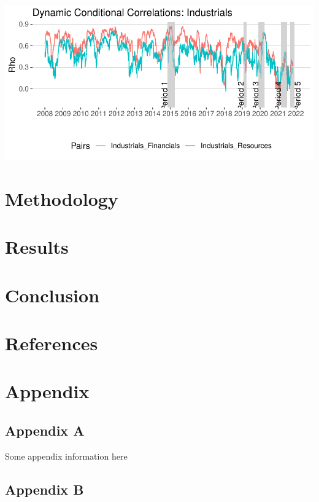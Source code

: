 \documentclass[11pt,preprint, authoryear]{elsarticle}
\let\origfigure\figure
\let\endorigfigure\endfigure
\renewenvironment{figure}[1][2] {
    \expandafter\origfigure\expandafter[H]
} {
    \endorigfigure
}
\numberwithin{equation}{section}
\numberwithin{figure}{section}
\numberwithin{table}{section}
\newlength{\cslhangindent}
\newenvironment{CSLReferences}%
  {\setlength{\parindent}{0pt}%
  \everypar{\setlength{\hangindent}{\cslhangindent}}\ignorespaces}%
  {\par}
\begin{document}
\begin{figure}[H]

{\centering \includegraphics{Paper_files/figure-latex/DCCfulli-1} 

}

\caption{Dynamic Conditional Correlations: Industrials \label{DCCfulli}}\label{fig:DCCfulli}
\end{figure}

\hypertarget{methodology}{%
\section{\texorpdfstring{Methodology
\label{Meth}}{Methodology }}\label{methodology}}

\hypertarget{results}{%
\section{Results}\label{results}}

\hfill

\hypertarget{conclusion}{%
\section{Conclusion}\label{conclusion}}

\newpage

\hypertarget{references}{%
\section*{References}\label{references}}

\hypertarget{refs}{}
\begin{CSLReferences}{0}{0}
\end{CSLReferences}

\hypertarget{appendix}{%
\section*{Appendix}\label{appendix}}

\hypertarget{appendix-a}{%
\subsection*{Appendix A}\label{appendix-a}}

Some appendix information here

\hypertarget{appendix-b}{%
\subsection*{Appendix B}\label{appendix-b}}


\end{document}
